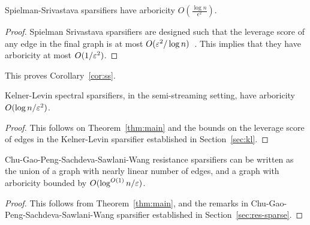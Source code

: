 \begin{theorem} 
Spielman-Srivastava sparsifiers have arboricity
$O\left(\frac{\log n}{\epsilon^2}\right)$.
\end{theorem}
\begin{proof}
Spielman Srivastava sparsifiers are designed such that the leverage
score of any edge in the final graph is at most
$O(\varepsilon^2 / \log n)$~\cite{SpielmanS08}.
This implies that they have arboricity
at most $O(1/\varepsilon^2)$.
\end{proof}
This proves Corollary~\ref{cor:ss}.

\begin{theorem} 
Kelner-Levin spectral sparsifiers, in the semi-streaming setting, have arboricity $O( \log n /
    \varepsilon^2)$.
\end{theorem}
\begin{proof}
This follows on Theorem~\ref{thm:main} and the bounds on the leverage score of edges in the
Kelner-Levin sparsifier established in Section~\ref{sec:kl}.
\end{proof}

\begin{theorem} 
Chu-Gao-Peng-Sachdeva-Sawlani-Wang resistance sparsifiers can be written
as the union of a graph with nearly linear number of edges, and a graph
with arboricity bounded by
$O(\log^{O(1)}n / \varepsilon)$.
\end{theorem}
\begin{proof}
This follows from Theorem~\ref{thm:main}, and the remarks in
Chu-Gao-Peng-Sachdeva-Sawlani-Wang sparsifier established in
Section~\ref{sec:res-sparse}.
\end{proof}
